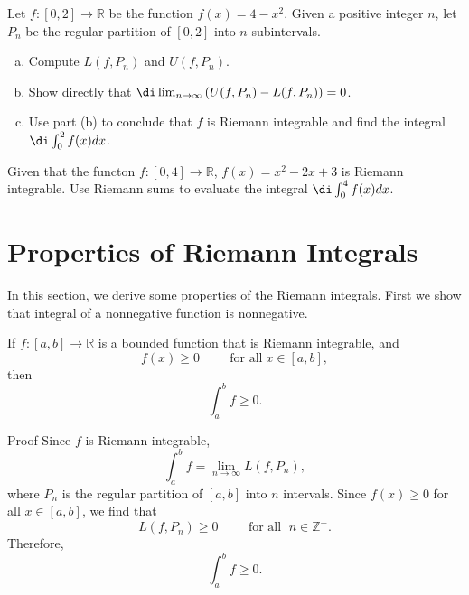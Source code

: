 \begin{question}{\themyquestion}
Let $f:[0, 2]\to\mathbb{R}$ be the function $f(x)=4-x^2 $. Given a positive integer $n$, let $P_n$ be the regular partition of $[0,2]$ into $n$ subintervals.
\begin{enumerate}[(a)]
\item Compute $L(f,P_n)$ and $U(f, P_n)$.
\item Show directly that $\di \lim_{n\to\infty}\left(U(f,P_n)-L(f,P_n)\right)=0$.
\item Use part (b) to conclude that $f$ is Riemann integrable and find the integral $\di \int_0^2f(x)dx$.
\end{enumerate}
\end{question}
 \atc



\begin{question}{\themyquestion}Given that the functon $f:[0, 4]\to\mathbb{R}$, $f(x)=x^2-2x+3$ is Riemann integrable. Use Riemann sums to evaluate the integral $\di \int_0^4f(x)dx$.
\end{question}
\vp

\section{Properties of Riemann Integrals  }\label{sec4.2}
In this section, we derive some properties of the Riemann integrals.
First we show that integral of a nonnegative function is nonnegative.
\begin{theorem}[label=230221_5]{}
If $f:[a,b]\to\mathbb{R}$ is a bounded function that is Riemann integrable, and \[f(x)\geq 0\hspace{1cm} \text{for all}\;x\in [a, b],\] then \[\int_a^b f\geq 0.\]
\end{theorem}
\begin{myproof}{Proof}
Since $f$ is Riemann integrable,  
\[\int_a^b f=\lim_{n\to \infty}L(f,P_n),\]
where $P_n$ is the regular partition of $[a,b]$ into $n$ intervals. 
Since $f(x)\geq 0$ for all $x\in [a, b]$, we find that\[L(f,P_n)\geq 0\hspace{1cm}\text{for all }\;n\in\mathbb{Z}^+.\] Therefore,
\[\int_a^b f\geq 0.\]
\end{myproof}

